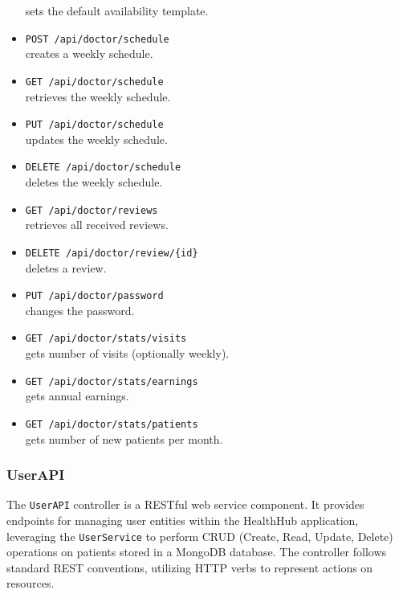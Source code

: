 \begin{itemize}
	sets the default availability template.
	\item \texttt{POST /api/doctor/schedule} \\
	creates a weekly schedule.
	\item \texttt{GET /api/doctor/schedule} \\
	retrieves the weekly schedule.
	\item \texttt{PUT /api/doctor/schedule} \\
	updates the weekly schedule.
	\item \texttt{DELETE /api/doctor/schedule} \\
	deletes the weekly schedule.
	\item \texttt{GET /api/doctor/reviews} \\
	retrieves all received reviews.
	\item \texttt{DELETE /api/doctor/review/\{id\}} \\
	deletes a review.
	\item \texttt{PUT /api/doctor/password} \\
	changes the password.
	\item \texttt{GET /api/doctor/stats/visits}\\
	gets number of visits (optionally weekly).
	\item \texttt{GET /api/doctor/stats/earnings}\\
	gets annual earnings.
	\item \texttt{GET /api/doctor/stats/patients} \\
	gets number of new patients per month.
\end{itemize}

\subsubsection{UserAPI}
The \texttt{UserAPI} controller is a RESTful web service component. It provides endpoints for managing user entities within the HealthHub application, leveraging the \texttt{UserService} to perform CRUD (Create, Read, Update, Delete) operations on patients stored in a MongoDB database. The controller follows standard REST conventions, utilizing HTTP verbs to represent actions on resources. 

